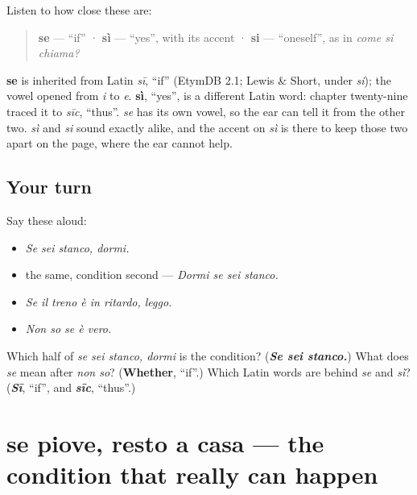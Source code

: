\begin{cousinweb}
Listen to how close these are:

\begin{quote}
\textbf{se} — \textquotedblleft{}if\textquotedblright{} · \textbf{sì} — \textquotedblleft{}yes\textquotedblright{}, with its accent · \textbf{si} — \textquotedblleft{}oneself\textquotedblright{}, as in \emph{come si chiama?}
\end{quote}

\textbf{se} is inherited from Latin \emph{sī}, \textquotedblleft{}if\textquotedblright{} (EtymDB 2.1; Lewis \& Short, under \emph{si}); the vowel opened from \emph{i} to \emph{e}. \textbf{sì}, \textquotedblleft{}yes\textquotedblright{}, is a different Latin word: chapter twenty-nine traced it to \emph{sīc}, \textquotedblleft{}thus\textquotedblright{}. \emph{se} has its own vowel, so the ear can tell it from the other two. \emph{sì} and \emph{si} sound exactly alike, and the accent on \emph{sì} is there to keep those two apart on the page, where the ear cannot help.
\end{cousinweb}

\subsection*{Your turn}
Say these aloud:

\begin{itemize}
\raggedright
  \item \emph{Se sei stanco, dormi.}
  \item the same, condition second — \emph{Dormi se sei stanco.}
  \item \emph{Se il treno è in ritardo, leggo.}
  \item \emph{Non so se è vero.}
\end{itemize}

\begin{tcolorbox}[breakable,colback=teal!4,colframe=teal!35!black,title={Before you move on}]
Which half of \emph{se sei stanco, dormi} is the condition? (\emph{\textbf{Se sei stanco.}}) What does \emph{se} mean after \emph{non so}? (\textbf{Whether}, \textquotedblleft{}if\textquotedblright{}.) Which Latin words are behind \emph{se} and \emph{sì}? (\emph{\textbf{Sī}}, \textquotedblleft{}if\textquotedblright{}, and \emph{\textbf{sīc}}, \textquotedblleft{}thus\textquotedblright{}.)
\end{tcolorbox}
\section[se piove, resto a casa]{se piove, resto a casa — the condition that really can happen}

